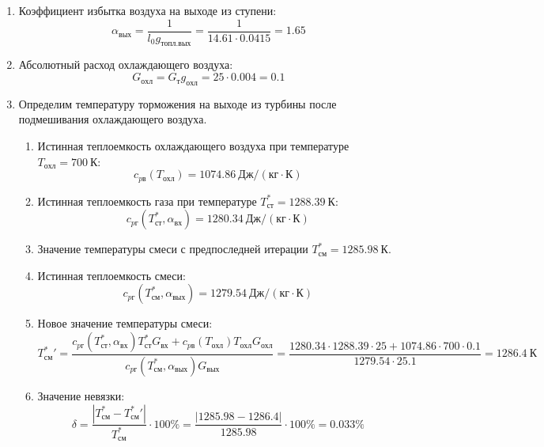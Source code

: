 \documentclass[a4paper,10pt]{article}
\begin{document}
\begin{enumerate}
        \item Коэффициент избытка воздуха на выходе из ступени:
        \[
            \alpha_{вых} = \frac{ 1 }{ l_0 g_{топл.вых} } =
                \frac{ 1 }{ 14.61 \cdot 0.0415 } =
            1.65
        \]

        \item Абсолютный расход охлаждающего воздуха:
        \[
            G_{охл} = G_т g_{охл} = 25 \cdot 0.004 =
            0.1
        \]

        \item Определим температуру торможения на выходе из турбины после подмешивания охлаждающего воздуха.
        \begin{enumerate}

            \item Истинная теплоемкость охлаждающего воздуха при температуре $T_{охл} = 700\ К $:
            \[
                c_{pв} (T_{охл}) = 1074.86\ Дж/ (кг \cdot К)
            \]

            \item Истинная теплоемкость газа при температуре $T_{ст}^* = 1288.39 \ К $:
            \[
                c_{pг} (T_{ст}^*, \alpha_{вх}) =
                1280.34\ Дж/ (кг \cdot К)
            \]

            \item Значение температуры смеси с предпоследней итерации $T_{см}^{*} = 1285.98\ К$.

            \item Истинная теплоемкость смеси:
            \[
                c_{pг} (T_{см}^{*}, \alpha_{вых}) =
                1279.54\ Дж/ (кг \cdot К)
            \]

            \item Новое значение температуры смеси:
            \[
                T_{см}^*\prime = \frac{
                        c_{pг} (T_{ст}^*, \alpha_{вх}) T_{ст}^* G_{вх} + c_{pв} (T_{охл}) T_{охл} G_{охл}
                    }{
                        c_{pг} (T_{см}^{*}, \alpha_{вых}) G_{вых}
                    } =
                \frac{
                    1280.34
                    \cdot 1288.39 \cdot 25 +
                    1074.86
                    \cdot 700 \cdot 0.1
                }{
                    1279.54
                    \cdot  25.1
                } =
                1286.4\ К
            \]

            \item Значение невязки:
            \[
                \delta = \frac{ \left| T_{см}^{*} - T_{см}^*\prime \right| }{T_{см}^{*}} \cdot 100 \% =
                    \frac{
                        \left| 1285.98 - 1286.4 \right|
                    }{
                        1285.98
                    } \cdot 100 \% =
                0.033 \%
            \]

        \end{enumerate}

        

    \end{enumerate}
    
\end{document}

